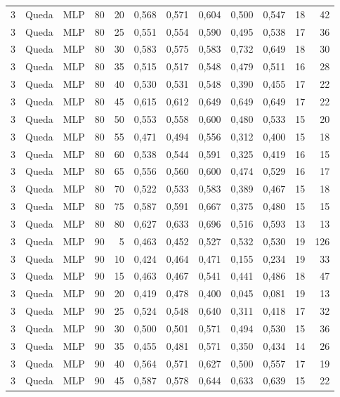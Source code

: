 \begin{longtable}{@{}rllrrrrrrrrr@{}}
3 & Queda & MLP & 80 & 20 & 0,568 & 0,571 & 0,604 & 0,500 & 0,547 & 18 & 42 \\
3 & Queda & MLP & 80 & 25 & 0,551 & 0,554 & 0,590 & 0,495 & 0,538 & 17 & 36 \\
3 & Queda & MLP & 80 & 30 & 0,583 & 0,575 & 0,583 & 0,732 & 0,649 & 18 & 30 \\
3 & Queda & MLP & 80 & 35 & 0,515 & 0,517 & 0,548 & 0,479 & 0,511 & 16 & 28 \\
3 & Queda & MLP & 80 & 40 & 0,530 & 0,531 & 0,548 & 0,390 & 0,455 & 17 & 22 \\
3 & Queda & MLP & 80 & 45 & 0,615 & 0,612 & 0,649 & 0,649 & 0,649 & 17 & 22 \\
3 & Queda & MLP & 80 & 50 & 0,553 & 0,558 & 0,600 & 0,480 & 0,533 & 15 & 20 \\
3 & Queda & MLP & 80 & 55 & 0,471 & 0,494 & 0,556 & 0,312 & 0,400 & 15 & 18 \\
3 & Queda & MLP & 80 & 60 & 0,538 & 0,544 & 0,591 & 0,325 & 0,419 & 16 & 15 \\
3 & Queda & MLP & 80 & 65 & 0,556 & 0,560 & 0,600 & 0,474 & 0,529 & 16 & 17 \\
3 & Queda & MLP & 80 & 70 & 0,522 & 0,533 & 0,583 & 0,389 & 0,467 & 15 & 18 \\
3 & Queda & MLP & 80 & 75 & 0,587 & 0,591 & 0,667 & 0,375 & 0,480 & 15 & 15 \\
3 & Queda & MLP & 80 & 80 & 0,627 & 0,633 & 0,696 & 0,516 & 0,593 & 13 & 13 \\
3 & Queda & MLP & 90 & 5 & 0,463 & 0,452 & 0,527 & 0,532 & 0,530 & 19 & 126 \\
3 & Queda & MLP & 90 & 10 & 0,424 & 0,464 & 0,471 & 0,155 & 0,234 & 19 & 33 \\
3 & Queda & MLP & 90 & 15 & 0,463 & 0,467 & 0,541 & 0,441 & 0,486 & 18 & 47 \\
3 & Queda & MLP & 90 & 20 & 0,419 & 0,478 & 0,400 & 0,045 & 0,081 & 19 & 13 \\
3 & Queda & MLP & 90 & 25 & 0,524 & 0,548 & 0,640 & 0,311 & 0,418 & 17 & 32 \\
3 & Queda & MLP & 90 & 30 & 0,500 & 0,501 & 0,571 & 0,494 & 0,530 & 15 & 36 \\
3 & Queda & MLP & 90 & 35 & 0,455 & 0,481 & 0,571 & 0,350 & 0,434 & 14 & 26 \\
3 & Queda & MLP & 90 & 40 & 0,564 & 0,571 & 0,627 & 0,500 & 0,557 & 17 & 19 \\
3 & Queda & MLP & 90 & 45 & 0,587 & 0,578 & 0,644 & 0,633 & 0,639 & 15 & 22 \\

\end{longtable}

